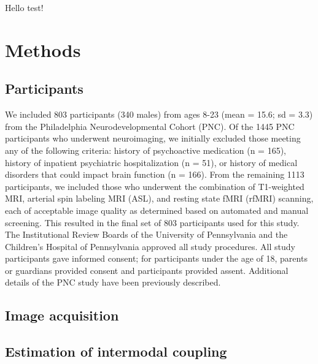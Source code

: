 \documentclass[
  12pt,
]{article}
\begin{document}
Hello test!

\hypertarget{methods}{%
\section{Methods}\label{methods}}

\hypertarget{participants}{%
\subsection{Participants}\label{participants}}

We included 803 participants (340 males) from ages 8-23 (mean = 15.6; sd = 3.3) from the Philadelphia Neurodevelopmental Cohort (PNC)\citep{satterthwaite_neuroimaging_2014}. Of the 1445 PNC participants who underwent neuroimaging, we initially excluded those meeting any of the following criteria: history of psychoactive medication (n = 165), history of inpatient psychiatric hospitalization (n = 51), or history of medical disorders that could impact brain function (n = 166). From the remaining 1113 participants, we included those who underwent the combination of T1-weighted MRI, arterial spin labeling MRI (ASL), and resting state fMRI (rfMRI) scanning, each of acceptable image quality as determined based on automated and manual screening. This resulted in the final set of 803 participants used for this study.
The Institutional Review Boards of the University of Pennsylvania and the Children's Hospital of Pennsylvania approved all study procedures. All study participants gave informed consent; for participants under the age of 18, parents or guardians provided consent and participants provided assent. Additional details of the PNC study have been previously described\citep{satterthwaite_neuroimaging_2014}.

\hypertarget{image-acquisition}{%
\subsection{Image acquisition}\label{image-acquisition}}

\hypertarget{estimation-of-intermodal-coupling}{%
\subsection{Estimation of intermodal coupling}\label{estimation-of-intermodal-coupling}}
\end{document}
